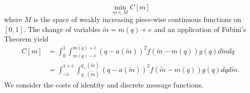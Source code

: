 \documentclass{article}
\begin{document}
\begin{equation}
	\min_{m\in M}C[m]
\end{equation}
where $M$ is the space of weakly increasing piece-wise continuous functions on $[0,1]$. The change of variables $\widetilde{m}=m(q)+e$ and an application of Fubini's Theorem yield 
\begin{align}
	C[m]& =\int_{0}^{1}{\int_{m(q)-\bar{e}}^{m(q)+\bar{e}}{(q-a( \widetilde{m}))^{2}f(\widetilde{m}-m(q))g(q)d\widetilde{m}}dq} \\
	& =\int_{-\bar{e}}^{1+\bar{e}}{\int_{q_{-}(\widetilde{m})}^{q_{+}(\widetilde{m})}{(q-a(\widetilde{m}))^{2}f(\widetilde{m}-m(q))g(q)dq}d\widetilde{m}}.
\end{align}
We consider the costs of identity and discrete message functions.

\end{document}
